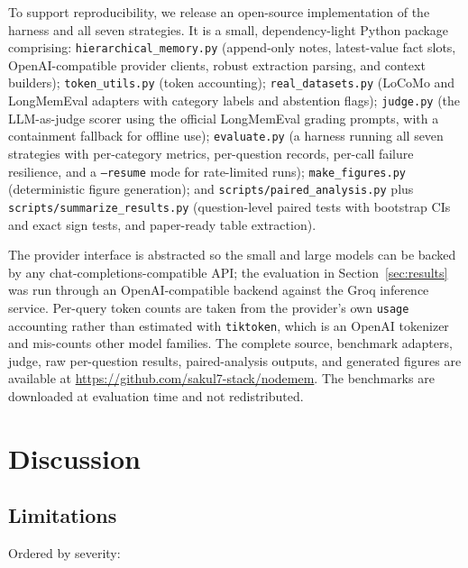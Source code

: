\documentclass[conference]{IEEEtran}
\begin{document}
To support reproducibility, we release an open-source implementation of the harness and all seven strategies. It is a small, dependency-light Python package comprising: \texttt{hierarchical\_memory.py} (append-only notes, latest-value fact slots, OpenAI-compatible provider clients, robust extraction parsing, and context builders); \texttt{token\_utils.py} (token accounting); \texttt{real\_datasets.py} (LoCoMo and LongMemEval adapters with category labels and abstention flags); \texttt{judge.py} (the LLM-as-judge scorer using the official LongMemEval grading prompts, with a containment fallback for offline use); \texttt{evaluate.py} (a harness running all seven strategies with per-category metrics, per-question records, per-call failure resilience, and a \texttt{--resume} mode for rate-limited runs); \texttt{make\_figures.py} (deterministic figure generation); and \texttt{scripts/paired\_analysis.py} plus \texttt{scripts/summarize\_results.py} (question-level paired tests with bootstrap CIs and exact sign tests, and paper-ready table extraction).

The provider interface is abstracted so the small and large models can be backed by any chat-completions-compatible API; the evaluation in Section~\ref{sec:results} was run through an OpenAI-compatible backend against the Groq inference service. Per-query token counts are taken from the provider's own \texttt{usage} accounting rather than estimated with \texttt{tiktoken}, which is an OpenAI tokenizer and mis-counts other model families. The complete source, benchmark adapters, judge, raw per-question results, paired-analysis outputs, and generated figures are available at \url{https://github.com/sakul7-stack/nodemem}. The benchmarks are downloaded at evaluation time and not redistributed.

\section{Discussion}

\subsection{Limitations}
\label{sec:limitations}

Ordered by severity:
\end{document}
